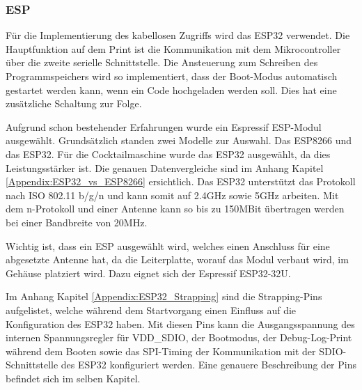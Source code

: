 \newpage
\subsubsection{ESP}
\label{subsubsec:ESP}

Für die Implementierung des kabellosen Zugriffs wird das ESP32 verwendet. Die Hauptfunktion auf dem Print ist die Kommunikation mit dem Mikrocontroller über die zweite serielle Schnittstelle. Die Ansteuerung zum Schreiben des Programmspeichers wird so implementiert, dass der Boot-Modus automatisch gestartet werden kann, wenn ein Code hochgeladen werden soll. Dies hat eine zusätzliche Schaltung zur Folge.

Aufgrund schon bestehender Erfahrungen wurde ein Espressif ESP-Modul ausgewählt. Grundsätzlich standen zwei Modelle zur Auswahl. Das ESP8266 und das ESP32. Für die Cocktailmaschine wurde das ESP32 ausgewählt, da dies Leistungsstärker ist. Die genauen Datenvergleiche sind im Anhang Kapitel \ref{Appendix:ESP32_vs_ESP8266} ersichtlich. Das ESP32 unterstützt das Protokoll nach ISO 802.11 b/g/n und kann somit auf 2.4GHz sowie 5GHz arbeiten. Mit dem n-Protokoll und einer Antenne kann so bis zu 150MBit übertragen werden bei einer Bandbreite von 20MHz.

Wichtig ist, dass ein ESP ausgewählt wird, welches einen Anschluss für eine abgesetzte Antenne hat, da die Leiterplatte, worauf das Modul verbaut wird, im Gehäuse platziert wird. Dazu eignet sich der Espressif ESP32-32U.

Im Anhang Kapitel \ref{Appendix:ESP32_Strapping} sind die Strapping-Pins aufgelistet, welche während dem Startvorgang einen Einfluss auf die Konfiguration des ESP32 haben. Mit diesen Pins kann die Ausgangsspannung des internen Spannungsregler für VDD\_SDIO, der Bootmodus, der Debug-Log-Print während dem Booten sowie das SPI-Timing der Kommunikation mit der SDIO-Schnittstelle des ESP32 konfiguriert werden. Eine genauere Beschreibung der Pins befindet sich im selben Kapitel.

%

